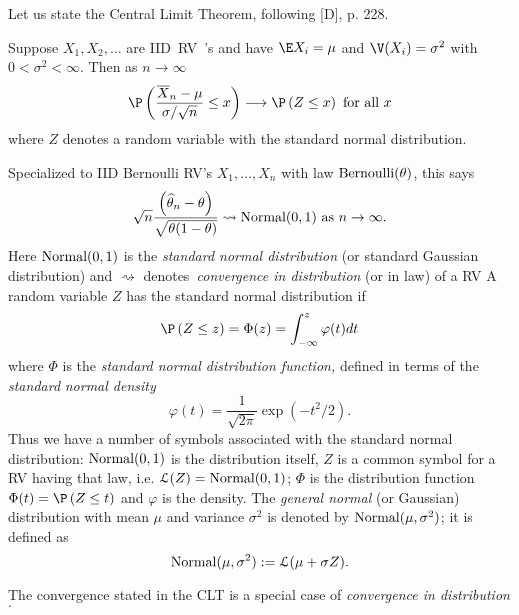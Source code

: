 Let us state the Central Limit Theorem, following [D], p. 228.

\begin{prop}
Suppose $X_{1},X_{2},\ldots $ are IID\ RV\ 's and have $\E X_{i}=\mu $
and $\V(X_{i})=\sigma ^{2}$ with $0<\sigma ^{2}<\infty $. Then as $%
n\rightarrow \infty $%
\begin{equation*}
\P \left( \frac{\overline{X}_{n}-\mu }{\sigma /\sqrt{n}}\leq x\right)
\longrightarrow \P \left( Z\leq x\right) \text{ for all }x
\end{equation*}%
where $Z$ denotes a random variable with the standard normal distribution.
\end{prop}

Specialized to IID Bernoulli RV's $X_{1},\ldots ,X_{n}$ with law $%
\bernoulli(\theta)$, this says 
\begin{equation}
\sqrt{n}\frac{\left( \widehat{\theta}_{n}-\theta\right) }{\sqrt{\theta(1-\theta)}}\rightsquigarrow
\mbox{{\rm Normal}}(0,1)\text{ as }n\rightarrow \infty .  \label{specialize-Bern}
\end{equation}%
Here $\mbox{{\rm Normal}}(0,1)$ is the \textit{standard normal distribution} (or standard
Gaussian distribution) and $\rightsquigarrow $ denotes\textit{\ convergence
in distribution} (or in law) of a RV A random variable $Z$ has the
standard normal distribution if 
\begin{equation*}
\P \left( Z\leq z\right) =\Phi (z)=\int_{-\infty }^{z}\varphi (t)dt
\end{equation*}%
where $\Phi $ is the \textit{standard normal distribution function, }defined
in terms of the \textit{standard} \textit{normal density }%
\begin{equation*}
\varphi (t)=\frac{1}{\sqrt{2\pi }}\exp \left( -t^{2}/2\right) .
\end{equation*}%
Thus we have a number of symbols associated with the standard normal
distribution: $\mbox{{\rm Normal}}(0,1)$ is the distribution itself, $Z$ is a common symbol
for a RV having that law, i.e. $\mathcal{L}(Z)=\mbox{{\rm Normal}}(0,1)$; $\Phi $ is the
distribution function $\Phi (t)=\P \left( Z\leq t\right) $ and $\varphi $
is the density. The \textit{general normal} (or Gaussian) distribution with
mean $\mu $ and variance $\sigma ^{2}$ is denoted by $\mbox{{\rm Normal}}(\mu ,\sigma ^{2})$;
it is defined as 
\begin{equation*}
\mbox{{\rm Normal}}(\mu ,\sigma ^{2}):=\mathcal{L}(\mu +\sigma Z).
\end{equation*}

The convergence stated in the CLT is a special case of \textit{convergence
in distribution}$.$


